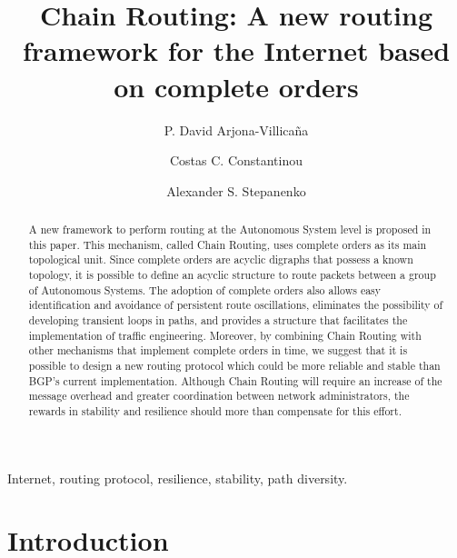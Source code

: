 \documentclass[5p,twocolumn]{elsarticle}
\begin{document}
\begin{frontmatter}

\title{Chain Routing: A new routing framework for the Internet based on complete orders}


\author[UoB]{P. David Arjona-Villica\~{n}a}

\author[UoB]{Costas C. Constantinou}

\author[Aston]{Alexander S. Stepanenko}


\address[UoB]{University of Birmingham, Edgbaston, Birmingham, B15 2TT, United Kingdom}
\address[Aston]{Aston University, Aston Triangle, Birmingham, B4 7ET, United Kingdom}




\begin{abstract}
A new framework to perform routing at the Autonomous System level is proposed in this paper. This mechanism, called Chain Routing, uses complete orders as its main topological unit. Since complete orders are acyclic digraphs that possess a known topology, it is possible to define an acyclic structure to route packets between a group of Autonomous Systems. The adoption of complete orders also allows easy identification and avoidance of persistent route oscillations, eliminates the possibility of developing transient loops in paths, and provides a structure that facilitates the implementation of traffic engineering. Moreover, by combining Chain Routing with other mechanisms that implement complete orders in time, we suggest that it is possible to design a new routing protocol which could be more reliable and stable than BGP's current implementation. Although Chain Routing will require an increase of the message overhead and greater coordination between network administrators, the rewards in stability and resilience should more than compensate for this effort.
\end{abstract}

\begin{keyword}
Internet, routing protocol, resilience, stability, path diversity.
\end{keyword}


\end{frontmatter}




\section{Introduction}\label{intro}
\end{document}
